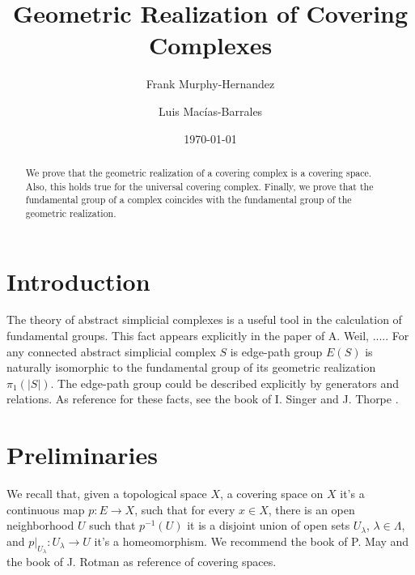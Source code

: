 \documentclass{amsart}
\begin{document}
\title{Geometric Realization of Covering Complexes}

\author{Frank Murphy-Hernandez}
\address{Facultad de Ciencias, UNAM, Mexico City}

\author{Luis Mac\'ias-Barrales}
\address{Instituto de Matem\'aticas, UNAM, Mexico City}
\email{}


\date{\today}


\begin{abstract}
We prove that the geometric realization of a covering complex is a covering space. Also, this holds true for the universal covering complex. Finally, we prove that the fundamental group of a complex coincides with the fundamental group of the geometric realization.
\end{abstract}

\maketitle

\section*{Introduction}

The theory of abstract simplicial complexes is a useful tool in the calculation of fundamental groups. This fact appears explicitly in the paper \cite{weil1960discrete} of A. Weil, .....
For any connected abstract simplicial complex $S$ is edge-path group $E(S)$ is naturally isomorphic to the fundamental group of its geometric realization $\pi_1(\vert S\vert)$. The edge-path group could be described explicitly by  generators and relations. As reference for these facts, see the book of I. Singer and J. Thorpe \cite{singer2015lecture}. 

\section{Preliminaries}


We recall that, given a topological space $X$, a covering space on $X$ it's a continuous map $p\colon E\to X$, such that for every $x\in X$, there is an open neighborhood $U$ such that $p^{-1}(U)$ it is a disjoint union of open sets $U_{\lambda}$, $\lambda\in\Lambda$, and $p|_{U_{\lambda}}\colon U_{\lambda}\to U$ it's a homeomorphism. We recommend the book of P. May \cite{may1999concise} and the book of J. Rotman \cite{rotman2013introduction} as reference of covering spaces.
\end{document}
